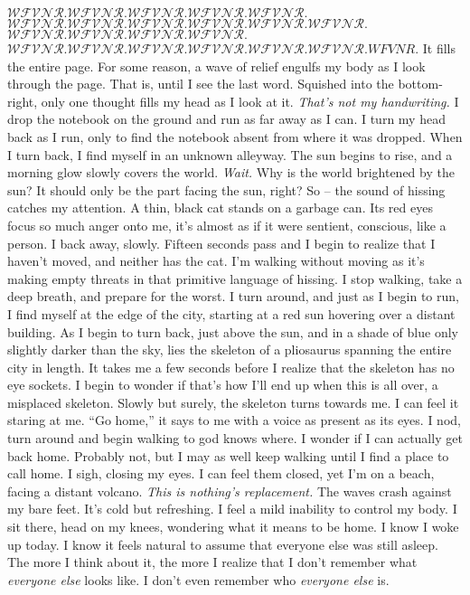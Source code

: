\documentclass[a4paper, 12pt]{book}
\newcommand\tab[1][1cm]{\hspace*{#1}}
\begin{document}
\newline
\tab
$\mathcal{WFVNR. WFVNR. WFVNR. WFVNR. WFVNR.}$
\newline
\tab
$\mathcal{WFVNR. WFVNR. WFVNR. WFVNR. WFVNR. WFVNR.}$
\newline
\tab
$\mathcal{WFVNR. WFVNR. WFVNR. WFVNR.}$
\newline
\tab
$\mathcal{WFVNR. WFVNR. WFVNR. WFVNR. WFVNR. WFVNR.}WFVNR.$
\newline
\tab
It fills the entire page. For some reason, a wave of relief engulfs my body as I look through the page. That is, until I see the last word. Squished into the bottom-right, only one thought fills my head as I look at it. \textit{That’s not my handwriting.}
\newline
\tab
I drop the notebook on the ground and run as far away as I can. I turn my head back as I run, only to find the notebook absent from where it was dropped. When I turn back, I find myself in an unknown alleyway. The sun begins to rise, and a morning glow slowly covers the world. \textit{Wait.} Why is the world brightened by the sun? It should only be the part facing the sun, right? So -- the sound of hissing catches my attention. A thin, black cat stands on a garbage can. Its red eyes focus so much anger onto me, it’s almost as if it were sentient, conscious, like a person. I back away, slowly. Fifteen seconds pass and I begin to realize that I haven’t moved, and neither has the cat. I’m walking without moving as it’s making empty threats in that primitive language of hissing.
\newline
\tab
I stop walking, take a deep breath, and prepare for the worst. I turn around, and just as I begin to run, I find myself at the edge of the city, starting at a red sun hovering over a distant building. As I begin to turn back, just above the sun, and in a shade of blue only slightly darker than the sky, lies the skeleton of a pliosaurus spanning the entire city in length. It takes me a few seconds before I realize that the skeleton has no eye sockets. I begin to wonder if that’s how I’ll end up when this is all over, a misplaced skeleton.
\newline
\tab
Slowly but surely, the skeleton turns towards me. I can feel it staring at me. ``Go home,'' it says to me with a voice as present as its eyes. I nod, turn around and begin walking to god knows where. I wonder if I can actually get back home. Probably not, but I may as well keep walking until I find a place to call home. I sigh, closing my eyes. I can feel them closed, yet I’m on a beach, facing a distant volcano. \textit{This is nothing’s replacement.} The waves crash against my bare feet. It’s cold but refreshing. I feel a mild inability to control my body. I sit there, head on my knees, wondering what it means to be home. I know I woke up today. I know it feels natural to assume that everyone else was still asleep. The more I think about it, the more I realize that I don’t remember what \textit{everyone else} looks like. I don’t even remember who \textit{everyone else} is. 
\end{document}
